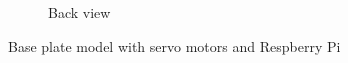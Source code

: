 \begin{figure}[ht]
\begin{subfigure}[b]{0.49\textwidth}
    \caption{Back view}
    \label{fig:const:int:base_back}
  \end{subfigure}
  \caption{Base plate model with servo motors and Respberry Pi}
  \label{fig:const:int:base}
\end{figure}